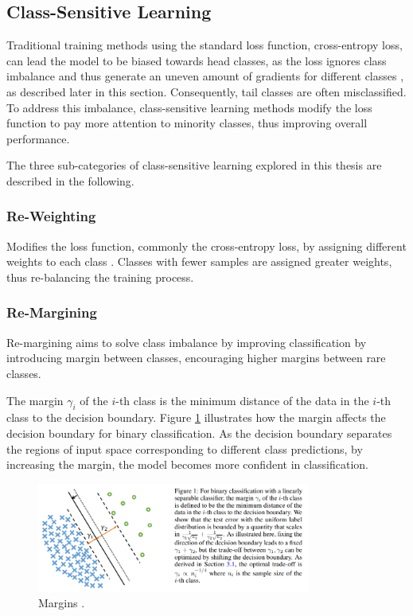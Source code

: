\subsection{Class-Sensitive Learning}
\label{sec:class-sensitive-learning}

Traditional training methods using the standard loss function, cross-entropy loss, can lead the model to be biased towards head classes, as the loss ignores class imbalance and thus generate an uneven amount of gradients for different classes \cite{zhang2023deep}, as described later in this section. Consequently, tail classes are often misclassified. To address this imbalance, class-sensitive learning methods modify the loss function  to pay more attention to minority classes, thus improving overall performance.

The three sub-categories of class-sensitive learning explored in this thesis are described in the following.

\subsubsection{Re-Weighting}
\label{sec:re-weighting}
Modifies the loss function, commonly the cross-entropy loss, by assigning different weights to each class \cite{zhang2023deep}. Classes with fewer samples are assigned greater weights, thus re-balancing the training process.

\subsubsection{Re-Margining}
\label{sec:re-margining}
Re-margining aims to solve class imbalance by improving classification by introducing margin between classes, encouraging higher margins between rare classes. 

The margin $\gamma_i$ of the $i$-th class is the minimum distance of the data in the $i$-th class to the decision boundary. Figure \ref{fig:decision_boundaries} illustrates how the margin affects the decision boundary for binary classification. As the decision boundary separates the regions of input space corresponding to different class predictions, by increasing the margin, the model becomes more confident in classification.


\begin{figure}[ht]
    \centering
    \includegraphics[width=0.8\textwidth]{Images/decision_boundary.png} 
    \caption{Margins \cite{cao2019learningimbalanceddatasetslabeldistributionaware}. }
    \label{fig:decision_boundaries} 
\end{figure}

